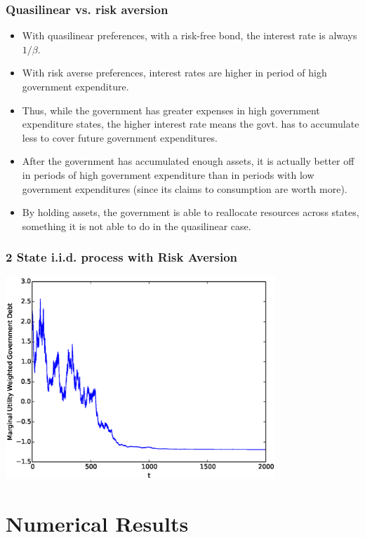 \documentclass{beamer}
\begin{document}
%
\begin{frame}
	\frametitle{Quasilinear vs. risk aversion}
	\begin{itemize}
				\item  With  quasilinear preferences, with a risk-free bond, the interest rate is always $1/\beta$.  
   \item With risk averse preferences, interest rates are higher in period of high government expenditure.
		\item  Thus, while the government has greater expenses in high government expenditure states, the higher interest rate means the govt. has to accumulate less to cover future government expenditures.
		\item  After the government has accumulated enough assets, it is actually better off in periods of high government expenditure than in periods with low government expenditures (since its claims to consumption are worth more).
		\item  By holding assets, the government is able to reallocate resources across states, something it is not able to do in the quasilinear case.
	\end{itemize}
\end{frame}

\begin{frame}
	\frametitle{2 State i.i.d. process with Risk Aversion}
	\begin{center}
	\includegraphics[width=4in]{Images/2stateiid.eps}
	\end{center}
\end{frame}

\section{Numerical Results}
\subsection{}
\end{document}
